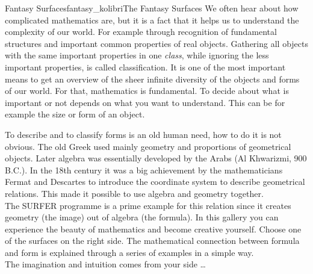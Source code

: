 \begin{surferIntroPage}{Fantasy Surfaces}{fantasy_kolibri}{The Fantasy Surfaces}
We often hear about how complicated mathematics are, but it is a fact that it helps us to understand the complexity of our world. For example through recognition of fundamental structures and important common properties of real objects. Gathering all objects with the same important properties in one \textit{class}, while ignoring the less important properties, is called classification. It is one of the most important means to get an overview of the sheer infinite diversity of the objects and forms of our world. For that, mathematics is fundamental. To decide about what is important or not depends on what you want to understand. This can be for example the size or form of an object.
\\

\vspace{0.4cm}

To describe and to classify forms is an old human need, how to do it is not obvious. The old Greek used mainly geometry and proportions of geometrical objects. Later algebra was essentially developed by the Arabs (Al Khwarizmi, 900 B.C.). In the 18th century it was a big achievement by the mathematicians Fermat and Descartes to introduce the coordinate system to describe geometrical relations. This made it possible to use algebra and geometry together.
\\
\vspace{0.4cm}
The SURFER programme is a prime example for this relation since it creates geometry (the image) out of algebra (the formula).
In this gallery you can experience the beauty of mathematics and become creative yourself. Choose one of the surfaces on the right side. The mathematical connection between formula and form is explained through a series of examples in a simple way.\\
The imagination and intuition comes from your side \dots
\end{surferIntroPage}
